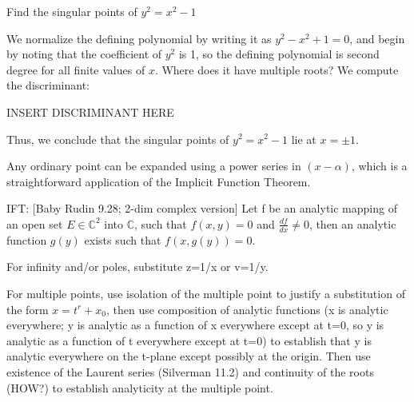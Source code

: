 \example Find the singular points of $y^2 = x^2 - 1$

We normalize the defining polynomial by writing it as $y^2 - x^2 + 1 =
0$, and begin by noting that the coefficient of $y^2$ is 1, so the
defining polynomial is second degree for all finite values of $x$.
Where does it have multiple roots?  We compute the discriminant:

INSERT DISCRIMINANT HERE

Thus, we conclude that the singular points of $y^2 = x^2 - 1$ lie at
$x = \pm 1$.

\endexample

Any ordinary point can be expanded using a power series in
$(x-\alpha)$, which is a straightforward application of the Implicit
Function Theorem.

IFT: [Baby Rudin 9.28; 2-dim complex version] Let f be an analytic
mapping of an open set $E \in {\mathbb C}^2$ into ${\mathbb C}$, such
that $f(x,y)=0$ and $\frac{df}{dx} \ne 0$, then an analytic
function $g(y)$ exists such that $f(x,g(y))=0$.

For infinity and/or poles, substitute z=1/x or v=1/y.

For multiple points, use isolation of the multiple point to justify a
substitution of the form $x=t^r+x_0$, then use composition of analytic
functions (x is analytic everywhere; y is analytic as a function of x
everywhere except at t=0, so y is analytic as a function of t
everywhere except at t=0) to establish that y is analytic everywhere
on the t-plane except possibly at the origin.  Then use existence of
the Laurent series (Silverman 11.2) and continuity of the roots (HOW?)
to establish analyticity at the multiple point.

%
%
%
%
%
%
%

